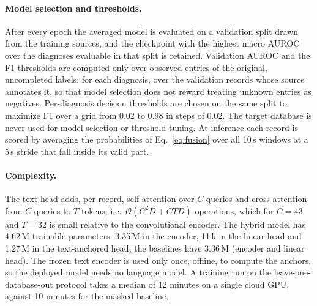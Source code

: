 \paragraph{Model selection and thresholds.}
After every epoch the averaged model is evaluated on a validation split drawn from the training sources, and the checkpoint with the highest macro AUROC over the diagnoses evaluable in that split is retained. Validation AUROC and the F1 thresholds are computed only over observed entries of the original, uncompleted labels: for each diagnosis, over the validation records whose source annotates it, so that model selection does not reward treating unknown entries as negatives. Per-diagnosis decision thresholds are chosen on the same split to maximize F1 over a grid from 0.02 to 0.98 in steps of 0.02. The target database is never used for model selection or threshold tuning. At inference each record is scored by averaging the probabilities of Eq.~\eqref{eq:fusion} over all 10\,s windows at a 5\,s stride that fall inside its valid part.

\paragraph{Complexity.}
The text head adds, per record, self-attention over $C$ queries and cross-attention from $C$ queries to $T$ tokens, i.e.\ $\mathcal{O}(C^2D+CTD)$ operations, which for $C=43$ and $T=32$ is small relative to the convolutional encoder. The hybrid model has 4.62\,M trainable parameters: 3.35\,M in the encoder, 11\,k in the linear head and 1.27\,M in the text-anchored head; the baselines have 3.36\,M (encoder and linear head). The frozen text encoder is used only once, offline, to compute the anchors, so the deployed model needs no language model. A training run on the leave-one-database-out protocol takes a median of 12 minutes on a single cloud GPU, against 10 minutes for the masked baseline.

